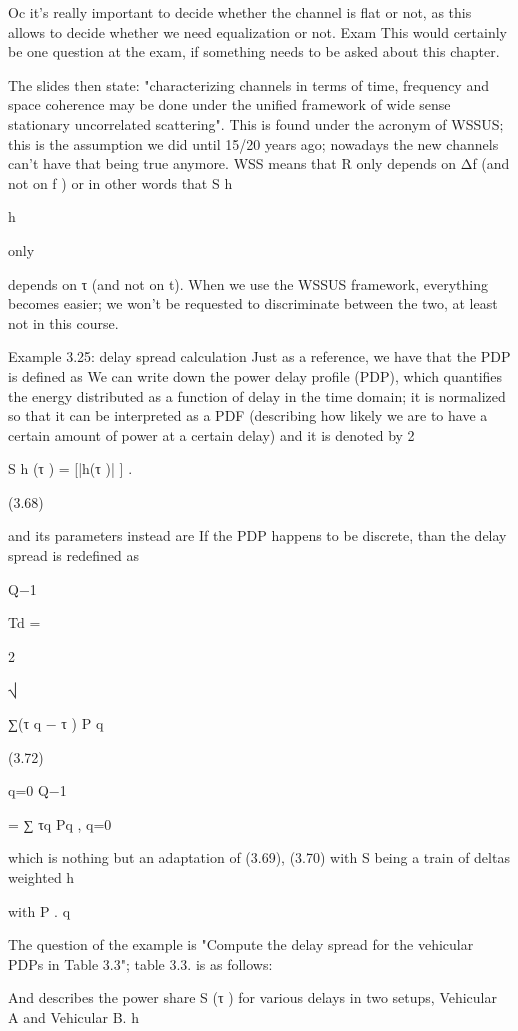 {{{{Oc it's really important to decide whether the channel is flat or not, as this allows to decide whether we need equalization or not.
Exam This would certainly be one question at the exam, if something needs to be asked about this chapter.

The slides then state: "characterizing channels in terms of time, frequency and space coherence may be done under the unified framework of wide sense stationary uncorrelated scattering".
This is found under the acronym of WSSUS; this is the assumption we did until 15/20 years ago; nowadays the new channels can't have that being true anymore.
WSS means that R only depends on Δf (and not on f ) or in other words that S h

h

only

depends on τ (and not on t).
When we use the WSSUS framework, everything becomes easier; we won't be requested to discriminate between the two, at least not in this course.

Example 3.25: delay spread calculation Just as a reference, we have that the PDP is defined as We can write down the power delay profile (PDP), which quantifies the energy distributed as a function of delay in the time domain; it is normalized so that it can be interpreted as a PDF (describing how likely we are to have a certain amount of power at a certain delay) and it is denoted by 2

S h (τ ) = [|h(τ )| ] .

(3.68)

and its parameters instead are If the PDP happens to be discrete, than the delay spread is redefined as


Q−1

Td =

2

⎷

∑(τ q − \mu τ ) P q

(3.72)

q=0 Q−1

 = ∑ τq Pq ,
q=0

which is nothing but an adaptation of (3.69), (3.70) with S being a train of deltas weighted h

with P .
q

The question of the example is "Compute the delay spread for the vehicular PDPs in Table 3.3"; table 3.3. is as follows:

And describes the power share S (τ ) for various delays in two setups, Vehicular A and Vehicular B.
h

}}}}
